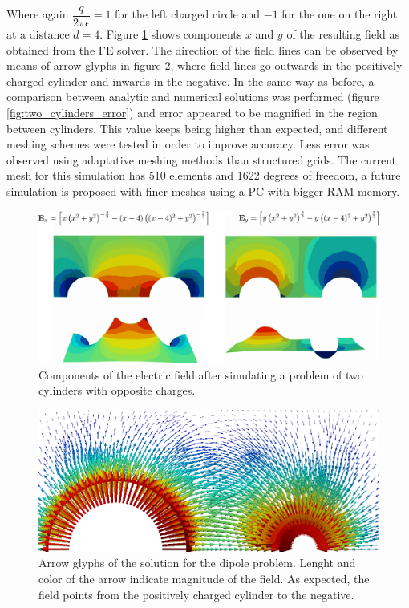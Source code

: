 Where again $\dfrac{q}{2\pi \epsilon} = 1$ for the left charged circle and $-1$ for the one on the right at a distance $d=4$. Figure \ref{fig:two_cylinders} shows components $x$ and $y$ of the resulting field as obtained from the FE solver. The direction of the field lines can be observed by means of arrow glyphs in figure \ref{fig:two_cylinders_glyph}, where field lines go outwards in the positively charged cylinder and inwards in the negative.
In the same way as before, a comparison between analytic and numerical solutions was performed (figure \ref{fig:two_cylinders_error}) and error appeared to be magnified in the region between cylinders. This value keeps being higher than expected, and different meshing schemes were tested in order to improve accuracy. Less error was observed using adaptative meshing methods than structured grids. The current mesh for this simulation has 510 elements and 1622 degrees of freedom, a future simulation is proposed with finer meshes using a PC with bigger RAM memory.

\begin{figure}
\centering
\includegraphics[scale=0.2]{./img/two_cylinders.pdf}
\caption{Components of the electric field after simulating a problem of two cylinders with opposite charges.}
\label{fig:two_cylinders}
\end{figure}

\begin{figure}
\centering
\includegraphics[scale=0.5]{./img/two_cylinders_Gliphs}
\caption{Arrow glyphs of the solution for the dipole problem. Lenght and color of the arrow indicate magnitude of the field. As expected, the field points from the positively charged cylinder to the negative.}
\label{fig:two_cylinders_glyph}
\end{figure}

